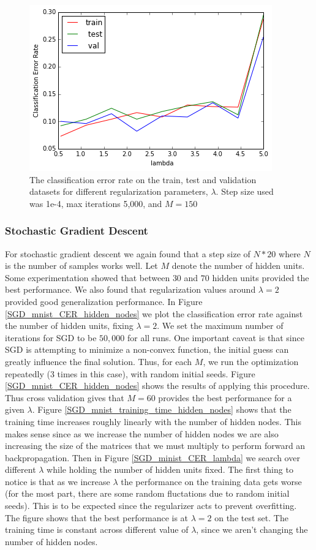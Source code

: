 \documentclass[10pt]{article}
\begin{document}
\begin{figure}
\centering
\includegraphics[scale=0.5]{MNIST_reg_batch.png}
\caption{The classification error rate on the train, test and validation datasets for different regularization parameters, $\lambda$.  Step size used was 1e-4, max iterations 5,000, and $M=150$}
\label{MNIST_reg_batch}
\end{figure}


\subsubsection*{Stochastic Gradient Descent}
For stochastic gradient descent we again found that a step size of $N*20$ where $N$ is the number of samples works well. Let $M$ denote the number of hidden units. Some experimentation showed that between $30$ and $70$ hidden units provided the best performance. We also found that regularization values around $\lambda = 2$ provided good generalization performance. In Figure \ref{SGD_mnist_CER_hidden_nodes} we plot the classification error rate against the number of hidden units, fixing $\lambda = 2$. We set the maximum number of iterations for SGD to be $50,000$ for all runs. One important caveat is that since SGD is attempting to minimize a non-convex function, the initial guess can greatly influence the final solution. Thus, for each $M$, we run the optimization repeatedly (3 times in this case), with random initial seeds. Figure \ref{SGD_mnist_CER_hidden_nodes} shows the results of applying this procedure. Thus cross validation gives that $M = 60$ provides the best performance for a given $\lambda$. Figure \ref{SGD_mnist_training_time_hidden_nodes} shows that the training time increases roughly linearly with the number of hidden nodes. This makes sense since as we increase the number of hidden nodes we are also increasing the size of the matrices that we must multiply to perform forward an backpropagation. Then in Figure \ref{SGD_minist_CER_lambda} we search over different $\lambda$ while holding the number of hidden units fixed. The first thing to notice is that as we increase $\lambda$ the performance on the training data gets worse (for the most part, there are some random fluctations due to random initial seeds). This is to be expected since the regularizer acts to prevent overfitting. The figure shows that the best performance is at $\lambda = 2$ on the test set. The training time is constant across different value of $\lambda$, since we aren't changing the number of hidden nodes.
\end{document}
